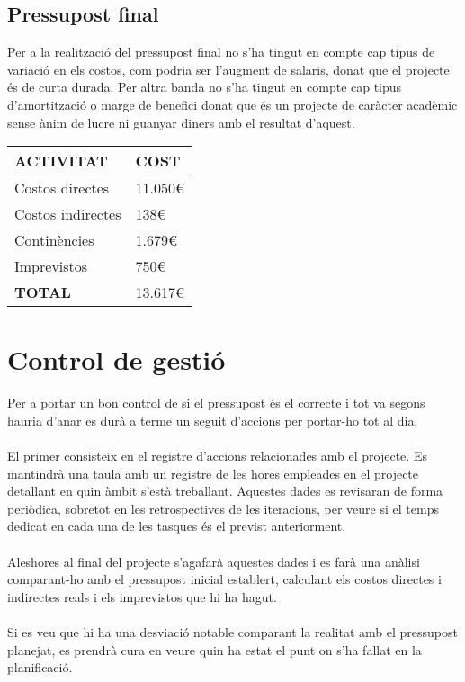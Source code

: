 \subsection{Pressupost final}

Per a la realització del pressupost final no s’ha tingut en compte cap tipus de variació en els costos, com podria ser l’augment de salaris, donat que el projecte és de curta durada. Per altra banda no s’ha tingut en compte cap tipus d’amortització o marge de benefici donat que és un projecte de caràcter acadèmic sense ànim de lucre ni guanyar diners amb el resultat d’aquest.
\\
\begin{center}
    \begin{tabular}{ | l | l |}
    \hline
	\textbf{ACTIVITAT}								&\textbf{COST} 			\\ \hline
    Costos directes									& 11.050\euro			\\ \hline
    Costos indirectes								& 138\euro				\\ \hline
    Continències									& 1.679\euro			\\ \hline
    Imprevistos										& 750\euro				\\ \hline
    \textbf{TOTAL}					 				& 13.617\euro			\\ 
    \hline
    \end{tabular}
\end{center}


\section{Control de gestió}

Per a portar un bon control de si el pressupost és el correcte i tot va segons hauria d’anar es durà a terme un seguit d’accions per portar-ho tot al dia.
\\\\
El primer consisteix en el registre d’accions relacionades amb el projecte. Es mantindrà una taula amb un registre de les hores empleades en el projecte detallant en quin àmbit s’està treballant. Aquestes dades es revisaran de forma periòdica, sobretot en les retrospectives de les iteracions, per veure si el temps dedicat en cada una de les tasques és el previst anteriorment.
\\\\
Aleshores al final del projecte s’agafarà aquestes dades i es farà una anàlisi comparant-ho amb el pressupost inicial establert, calculant els costos directes i indirectes reals i els imprevistos que hi ha hagut.
\\\\
Si es veu que hi ha una desviació notable comparant la realitat amb el pressupost planejat, es prendrà cura en veure quin ha estat el punt on s’ha fallat en la planificació.